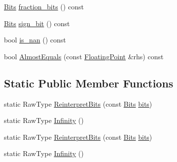 \begin{DoxyCompactItemize}
\hyperlink{classtesting_1_1internal_1_1FloatingPoint_adb12c064e30491d4976393880f9dca27}{\-Bits} \hyperlink{classtesting_1_1internal_1_1FloatingPoint_a1cc86cf7a384f5dfad4c4b74c3143095}{fraction\-\_\-bits} () const 
\item 
\hyperlink{classtesting_1_1internal_1_1FloatingPoint_adb12c064e30491d4976393880f9dca27}{\-Bits} \hyperlink{classtesting_1_1internal_1_1FloatingPoint_a7cbf434c7346c7162fb4897a3442dca9}{sign\-\_\-bit} () const 
\item 
bool \hyperlink{classtesting_1_1internal_1_1FloatingPoint_af95a0f6598aec42778acb7c86ef6acf2}{is\-\_\-nan} () const 
\item 
bool \hyperlink{classtesting_1_1internal_1_1FloatingPoint_aa4df645ea2a32d6baa212f1e43115010}{\-Almost\-Equals} (const \hyperlink{classtesting_1_1internal_1_1FloatingPoint}{\-Floating\-Point} \&rhs) const 
\end{DoxyCompactItemize}
\subsection*{\-Static \-Public \-Member \-Functions}
\begin{DoxyCompactItemize}
\item 
static \-Raw\-Type \hyperlink{classtesting_1_1internal_1_1FloatingPoint_af602b4c0ce9bfe8413df5b0af2735b74}{\-Reinterpret\-Bits} (const \hyperlink{classtesting_1_1internal_1_1FloatingPoint_adb12c064e30491d4976393880f9dca27}{\-Bits} \hyperlink{classtesting_1_1internal_1_1FloatingPoint_a4f9cc005ccb696e23e467f87a3a0a5ce}{bits})
\item 
static \-Raw\-Type \hyperlink{classtesting_1_1internal_1_1FloatingPoint_a59b4813c94bba67c6204d478f544cfc9}{\-Infinity} ()
\item 
static \-Raw\-Type \hyperlink{classtesting_1_1internal_1_1FloatingPoint_af602b4c0ce9bfe8413df5b0af2735b74}{\-Reinterpret\-Bits} (const \hyperlink{classtesting_1_1internal_1_1FloatingPoint_adb12c064e30491d4976393880f9dca27}{\-Bits} \hyperlink{classtesting_1_1internal_1_1FloatingPoint_a4f9cc005ccb696e23e467f87a3a0a5ce}{bits})
\item 
static \-Raw\-Type \hyperlink{classtesting_1_1internal_1_1FloatingPoint_a59b4813c94bba67c6204d478f544cfc9}{\-Infinity} ()
\end{DoxyCompactItemize}
